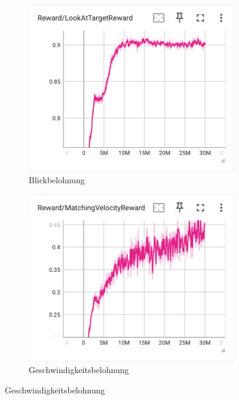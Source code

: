 \begin{figure}[H]
\begin{subfigure}{.49\textwidth}
    \end{subfigure}
     \begin{subfigure}{.49\textwidth}
      \centering  
      \includegraphics[width=\textwidth]{img/116_look_reward}
      \caption{Blickbelohnung}
      \label{fig:116_look_reward}
    \end{subfigure}
    \begin{subfigure}{.49\textwidth}
      \centering  
      \includegraphics[width=\textwidth]{img/116_vel_reward}
      \caption{Geschwindigkeitsbelohnung}
      \label{fig:116_vel_reward}
    \end{subfigure}

\end{figure}
